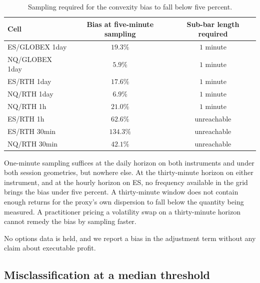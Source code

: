 \begin{table}[htbp]\centering\footnotesize
\caption{Sampling required for the convexity bias to fall below five percent.}
\label{tab:freq}
\begin{tabular}{lcc}
\toprule
Cell & Bias at five-minute sampling & Sub-bar length required \\
\midrule
ES/GLOBEX 1day & $19.3\%$ & $1$ minute \\ %
NQ/GLOBEX 1day & $5.9\%$  & $1$ minute \\ %
ES/RTH 1day    & $17.6\%$ & $1$ minute \\ %
NQ/RTH 1day    & $6.9\%$  & $1$ minute \\ %
NQ/RTH 1h      & $21.0\%$ & $1$ minute \\ %
ES/RTH 1h      & $62.6\%$ & unreachable \\ %
ES/RTH 30min   & $134.3\%$ & unreachable \\ %
NQ/RTH 30min   & $42.1\%$ & unreachable \\ %
\bottomrule
\end{tabular}
\end{table}

One-minute sampling suffices at the daily horizon on both instruments and under
both session geometries, but nowhere else. At the thirty-minute horizon on either
instrument, and at the hourly horizon on ES, no frequency available in the grid
brings the bias under five percent. A thirty-minute window does not contain
enough returns for the proxy's own dispersion to fall below the quantity being
measured. A practitioner pricing a volatility swap on a thirty-minute horizon
cannot remedy the bias by sampling faster.

No options data is held, and we report a bias in the adjustment term without any
claim about executable profit.

\subsection{Misclassification at a median threshold}

